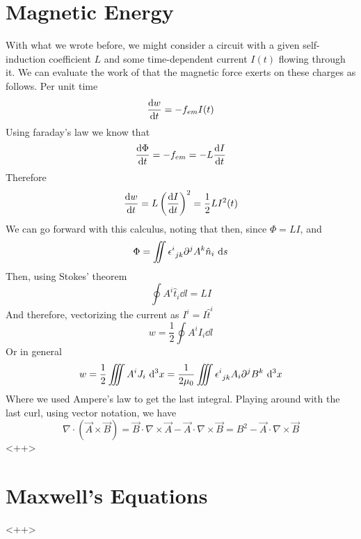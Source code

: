 \documentclass[../electromagnetism]{subfiles}
\begin{document}
\section{Magnetic Energy}
With what we wrote before, we might consider a circuit with a given self-induction coefficient $L$ and some time-dependent current $I(t)$ flowing through it. We can evaluate the work of that the magnetic force exerts on these charges as follows. Per unit time
\begin{equation}
	\dv{w}{t}=-f_{em}I(t)
	\label{eq:work/timemag}
\end{equation}
Using faraday's law we know that
\begin{equation*}
	\dv{\Phi}{t}=-f_{em}=-L\dv{I}{t}
\end{equation*}
Therefore 
\begin{equation}
	\dv{w}{t}=L\left( \dv{I}{t} \right)^2=\frac{1}{2}LI^2(t)
	\label{eq:mfenfaraday1}
\end{equation}
We can go forward with this calculus, noting that then, since $\Phi=LI$, and 
\begin{equation*}
	\Phi=\iint\epsilon^{i}_{\ jk}\partial^jA^k\hat{n}_i\ \mathrm{d} s
\end{equation*}
Then, using Stokes' theorem
\begin{equation*}
	\oint A^i\hat{t}_i\dd l=LI
\end{equation*}
And therefore, vectorizing the current as $I^i=I\hat{t}^i$
\begin{equation*}
	w=\frac{1}{2}\oint A^iI_i\dd l
\end{equation*}
Or in general
\begin{equation}
	w=\frac{1}{2}\iiint A^iJ_i\ \mathrm{d}^3x=\frac{1}{2\mu_0}\iiint\epsilon^{i}_{\ jk}A_i\partial^jB^k\ \mathrm{d}^3x
	\label{eq:workmagnetic}
\end{equation}
Where we used Ampere's law to get the last integral. Playing around with the last curl, using vector notation, we have
\begin{equation*}
	\nabla\cdot(\vec{A}\times\vec{B})=\vec{B}\cdot\nabla\times\vec{A}-\vec{A}\cdot\nabla\times\vec{B}=B^2-\vec{A}\cdot\nabla\times\vec{B}
\end{equation*}
<++>
\section{Maxwell's Equations}
<++>
\end{document}
